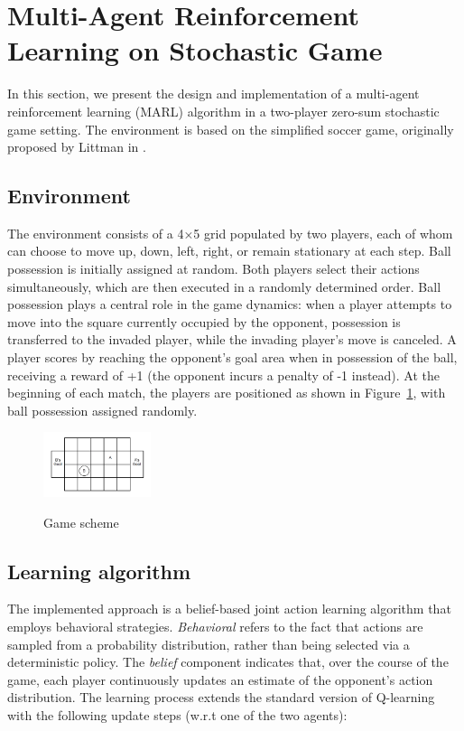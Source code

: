\documentclass[twocolumn, 9pt]{extarticle}
\begin{document}
\newpage

\section{Multi-Agent Reinforcement Learning on Stochastic Game}
In this section, we present the design and implementation of a multi-agent reinforcement learning (MARL) algorithm in a two-player zero-sum stochastic game setting. 
The environment is based on the simplified soccer game, originally proposed by Littman in \cite{littman1994markov}.
\subsection{Environment}
The environment consists of a 4×5 grid populated by two players, each of whom can choose to move up, down, left, right, or remain stationary at each step. Ball possession is initially assigned at random. Both players 
select their actions simultaneously, which are then executed in a randomly determined order. Ball possession plays a central role in the game 
dynamics: when a player attempts to move into the square currently occupied by the opponent, possession is transferred to 
the invaded player, while the invading player's move is canceled. A player scores by reaching the opponent's goal area 
when in possession of the ball, receiving a reward of +1 (the opponent incurs a penalty of -1 instead). At the beginning of each match, 
the players are positioned as shown in Figure~\ref{fig:game_scheme}, with ball possession assigned randomly.
\begin{figure}[h]
    \caption{\footnotesize{Game scheme}}
    \centering
    \includegraphics[width=0.28\textwidth]{../assets/game_scheme.png}
    \label{fig:game_scheme}
\end{figure}

\subsection{Learning algorithm}
The implemented approach is a belief-based joint action learning algorithm that employs behavioral strategies. \emph{Behavioral} refers to the fact that 
actions are sampled from a probability distribution, rather than being selected via a deterministic policy. The \emph{belief} component indicates that, over the 
course of the game, each player continuously updates an estimate of the opponent’s action distribution. The learning process extends the standard version of Q-learning with the 
following update steps (w.r.t one of the two agents):
\end{document}
